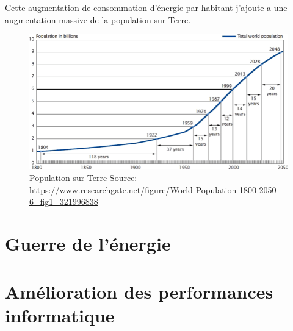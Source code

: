Cette augmentation de consommation d'énergie par habitant j'ajoute a une augmentation
massive de la population sur Terre.

\begin{figure}
  \centering
  \includegraphics[scale=0.35]{media/WorldPopulation.png}
  \caption{
      Population sur Terre\newline
      \tiny{Source:\newline
        \url{https://www.researchgate.net/figure/World-Population-1800-2050-6_fig1_321996838}
      }
  }
  \label{fig:capita_energy}
\end{figure}

\section{Guerre de l'énergie}
\section{Amélioration des performances informatique}
